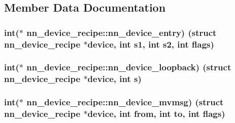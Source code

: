 \subsection{Member Data Documentation}
\subsubsection[{nn\+\_\+device\+\_\+entry}]{\setlength{\rightskip}{0pt plus 5cm}int($\ast$ nn\+\_\+device\+\_\+recipe\+::nn\+\_\+device\+\_\+entry) (struct {\bf nn\+\_\+device\+\_\+recipe} $\ast$device, int s1, int s2, int flags)}\hypertarget{structnn__device__recipe_adeb5d36621f14a9837fdc4cb94c3d051}{}\label{structnn__device__recipe_adeb5d36621f14a9837fdc4cb94c3d051}
\subsubsection[{nn\+\_\+device\+\_\+loopback}]{\setlength{\rightskip}{0pt plus 5cm}int($\ast$ nn\+\_\+device\+\_\+recipe\+::nn\+\_\+device\+\_\+loopback) (struct {\bf nn\+\_\+device\+\_\+recipe} $\ast$device, int s)}\hypertarget{structnn__device__recipe_a942a556adb7a502cce98f9090a6d0ebf}{}\label{structnn__device__recipe_a942a556adb7a502cce98f9090a6d0ebf}
\subsubsection[{nn\+\_\+device\+\_\+mvmsg}]{\setlength{\rightskip}{0pt plus 5cm}int($\ast$ nn\+\_\+device\+\_\+recipe\+::nn\+\_\+device\+\_\+mvmsg) (struct {\bf nn\+\_\+device\+\_\+recipe} $\ast$device, int from, int to, int flags)}\hypertarget{structnn__device__recipe_aaf7ad40c45c50814de02aa920f5e8a24}{}\label{structnn__device__recipe_aaf7ad40c45c50814de02aa920f5e8a24}
